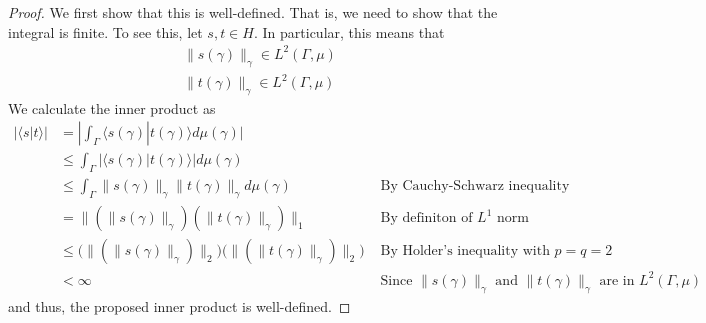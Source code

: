 \documentclass[fontsize=11pt]{scrartcl} %
\numberwithin{equation}{section} %
\numberwithin{figure}{section} %
\numberwithin{table}{section} %
\newcommand{\la}{\langle}
\newcommand{\ra}{\rangle}
\begin{document}
\begin{proof}
    We first show that this is well-defined. That is, we need to show that the
    integral is finite. To see this, let $s,t\in H$. In particular, this means
    that
    \[
        \begin{aligned}
            \|s(\gamma)\|_{\gamma}\in L^2(\Gamma,\mu)\\
            \|t(\gamma)\|_{\gamma}\in L^2(\Gamma,\mu)
    \end{aligned}
    \]
    We calculate the inner product as
    \[
\begin{aligned}
    |\la s|t\ra| &= |\int_{\Gamma}\la s(\gamma)|t(\gamma)\ra d\mu(\gamma)|\\
    &\leq \int_{\Gamma}|\la s(\gamma)|t(\gamma)\ra| d\mu(\gamma)\\
    &\leq \int_{\Gamma}\|s(\gamma)\|_{\gamma}\|t(\gamma)\|_{\gamma}
    d\mu(\gamma)&\text{ By Cauchy-Schwarz inequality}\\
    &=\|\left(\|s(\gamma)\|_{\gamma}\right)\left(\|t(\gamma)\|_{\gamma}\right)\|_1
    &\text{ By definiton of $L^1$ norm}\\
    &\leq
    \big(\|\left(\|s(\gamma)\|_{\gamma}\right)\|_2\big)
    \big(\|\left(\|t(\gamma)\|_{\gamma}\right)\|_2\big)
    &\text{ By Holder's inequality with $p=q=2$}\\
    &< \infty &\text{ Since $\|s(\gamma)\|_{\gamma}$ and
    $\|t(\gamma)\|_{\gamma}$ are in $L^2(\Gamma,\mu)$}
\end{aligned}
    \]
    and thus, the proposed inner product is well-defined.


\end{proof}
\end{document}
